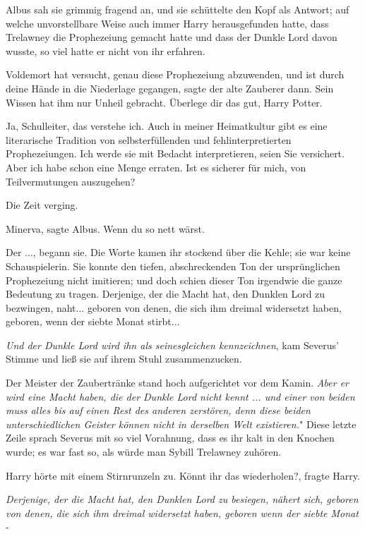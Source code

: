 Albus sah sie grimmig fragend an, und sie schüttelte den Kopf als Antwort; auf
welche unvorstellbare Weise auch immer Harry herausgefunden hatte, dass
Trelawney die Prophezeiung gemacht hatte und dass der Dunkle Lord davon wusste,
so viel hatte er nicht von ihr erfahren.

\glqq{}Voldemort hat versucht, genau diese Prophezeiung abzuwenden, und ist durch
deine Hände in die Niederlage gegangen\grqq{}, sagte der alte Zauberer dann.
\glqq{}Sein Wissen hat ihm nur Unheil gebracht. Überlege dir das gut, Harry
Potter.\grqq{}

\glqq{}Ja, Schulleiter, das verstehe ich. Auch in meiner Heimatkultur gibt es
eine literarische Tradition von selbsterfüllenden und fehlinterpretierten
Prophezeiungen. Ich werde sie mit Bedacht interpretieren, seien Sie versichert.
Aber ich habe schon eine Menge erraten. Ist es sicherer für mich, von
Teilvermutungen auszugehen?\grqq{}

Die Zeit verging.

\glqq{}Minerva\grqq{}, sagte Albus. \glqq{}Wenn du so nett wärst.\grqq{}

\glqq{}Der ...\grqq{}, begann sie. Die Worte kamen ihr stockend über die Kehle;
sie war keine Schauspielerin. Sie konnte den tiefen, abschreckenden Ton der
ursprünglichen Prophezeiung nicht imitieren; und doch schien dieser Ton
irgendwie die ganze Bedeutung zu tragen. \glqq{}Derjenige, der die Macht hat, den
Dunklen Lord zu bezwingen, naht... geboren von denen, die sich ihm dreimal
widersetzt haben, geboren, wenn der siebte Monat stirbt...\grqq{}

\glqq{}\emph{Und der Dunkle Lord wird ihn als seinesgleichen
kennzeichnen}\grqq{}, kam Severus' Stimme und ließ sie auf ihrem Stuhl
zusammenzucken.

Der Meister der Zaubertränke stand hoch aufgerichtet vor dem Kamin. \glqq{}
\emph{Aber er wird eine Macht haben, die der Dunkle Lord nicht kennt ... und
einer von beiden muss alles bis auf einen Rest des anderen zerstören, denn diese
beiden unterschiedlichen Geister können nicht in derselben Welt existieren.}"
Diese letzte Zeile sprach Severus mit so viel Vorahnung, dass es ihr kalt in den
Knochen wurde; es war fast so, als würde man Sybill Trelawney zuhören.

Harry hörte mit einem Stirnrunzeln zu. \glqq{}Könnt ihr das wiederholen?\grqq{},
fragte Harry.

\glqq{}\emph{Derjenige, der die Macht hat, den Dunklen Lord zu besiegen, nähert
sich, geboren von denen, die sich ihm dreimal widersetzt haben, geboren wenn der
siebte Monat} -\grqq{}

